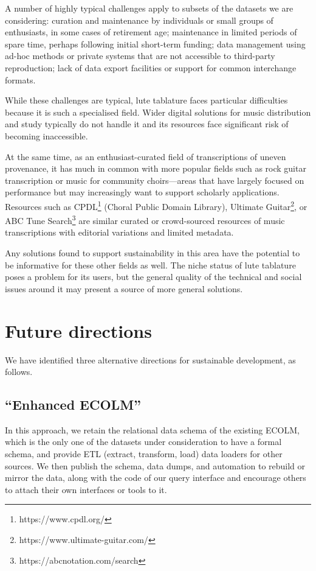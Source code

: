 \documentclass[sigconf, nonacm=true]{acmart}
\begin{document}
\begin{sloppypar}
  A number of highly typical challenges apply to subsets of the
  datasets we are considering: curation and maintenance by individuals
  or small groups of enthusiasts, in some cases of retirement age;
  maintenance in limited periods of spare time, perhaps following
  initial short-term funding; data management using ad-hoc methods or
  private systems that are not accessible to third-party reproduction;
  lack of data export facilities or support for common interchange
  formats.

  While these challenges are typical, lute tablature faces particular
  difficulties because it is such a specialised field. Wider digital
  solutions for music distribution and study typically do not handle
  it and its resources face significant risk of becoming inaccessible.

  At the same time, as an enthusiast-curated field of transcriptions
  of uneven provenance, it has much in common with more popular fields
  such as rock guitar transcription or music for community
  choirs---areas that have largely focused on performance but may
  increasingly want to support scholarly applications. Resources such
  as CPDL\footnote{https://www.cpdl.org/} (Choral Public Domain
  Library), Ultimate
  Guitar\footnote{https://www.ultimate-guitar.com/}, or ABC Tune
  Search\footnote{https://abcnotation.com/search} are similar curated
  or crowd-sourced resources of music transcriptions with editorial
  variations and limited metadata.

  Any solutions found to support sustainability in this area have the
  potential to be informative for these other fields as well. The
  niche status of lute tablature poses a problem for its users, but
  the general quality of the technical and social issues around it may
  present a source of more general solutions.
  
  \section{Future directions}

  We have identified three alternative directions for sustainable
  development, as follows.
  
  \subsection{``Enhanced ECOLM''}

  In this approach, we retain the relational data schema of the
  existing ECOLM, which is the only one of the datasets under
  consideration to have a formal schema, and provide ETL (extract,
  transform, load) data loaders for other sources. We then publish the
  schema, data dumps, and automation to rebuild or mirror the data,
  along with the code of our query interface and encourage others to
  attach their own interfaces or tools to it.


\end{sloppypar}
\end{document}
